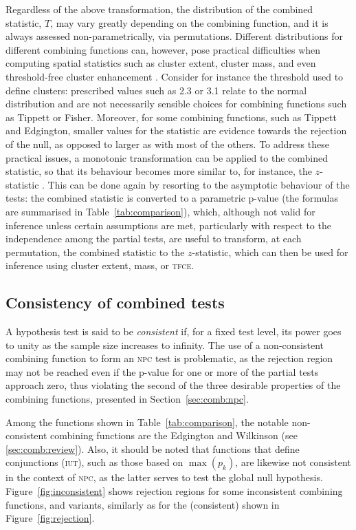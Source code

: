 Regardless of the above transformation, the distribution of the combined statistic, $T$, may vary greatly depending on the combining function, and it is always assessed non-parametrically, via permutations. Different distributions for different combining functions can, however, pose practical difficulties when computing spatial statistics such as cluster extent, cluster mass, and even threshold-free cluster enhancement \citep[\textsc{tfce},][]{Smith2009}. Consider for instance the threshold used to define clusters: prescribed values such as 2.3 or 3.1 \citep{Woo2014} relate to the normal distribution and are not necessarily sensible choices for combining functions such as Tippett or Fisher. Moreover, for some combining functions, such as Tippett and Edgington, smaller values for the statistic are evidence towards the rejection of the null, as opposed to larger as with most of the others. To address these practical issues, a monotonic transformation can be applied to the combined statistic, so that its behaviour becomes more similar to, for instance, the $z$-statistic \citep{Efron2004}. This can be done again by resorting to the asymptotic behaviour of the tests: the combined statistic is converted to a parametric p-value (the formulas are summarised in Table~\ref{tab:comparison}), which, although not valid for inference unless certain assumptions are met, particularly with respect to the independence among the partial tests, are useful to transform, at each permutation, the combined statistic to the $z$-statistic, which can then be used for inference using cluster extent, mass, or \textsc{tfce}.

\subsection{Consistency of combined tests}
\label{sec:comb:consistency}

A hypothesis test is said to be \emph{consistent} if, for a fixed test level, its power goes to unity as the sample size increases to infinity. The use of a non-consistent combining function to form an \textsc{npc} test is problematic, as the rejection region may not be reached even if the p-value for one or more of the partial tests approach zero, thus violating the second of the three desirable properties of the combining functions, presented in Section~\ref{sec:comb:npc}.

Among the functions shown in Table~\ref{tab:comparison}, the notable non-consistent combining functions are the Edgington and Wilkinson (see \ref{sec:comb:review}). Also, it should be noted that functions that define conjunctions (\textsc{iut}), such as those based on $\max\left(p_k\right)$, are likewise not consistent in the context of \textsc{npc}, as the latter serves to test the global null hypothesis. Figure~\ref{fig:inconsistent} shows rejection regions for some inconsistent combining functions, and variants, similarly as for the (consistent) shown in Figure~\ref{fig:rejection}.

